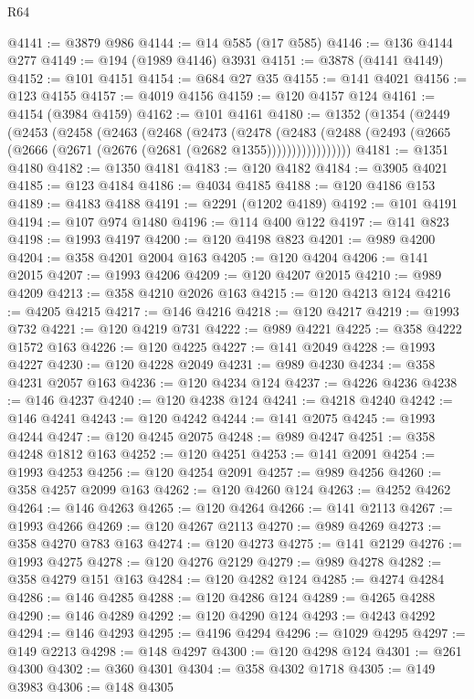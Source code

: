 \begin{lexlean}{R64}
\begin{coremodule}
@4141 := @3879 @986
@4144 := @14 @585 (@17 @585)
@4146 := @136 @4144 @277
@4149 := @194 (@1989 @4146) @3931
@4151 := @3878 (@4141 @4149)
@4152 := @101 @4151
@4154 := @684 @27 @35
@4155 := @141 @4021
@4156 := @123 @4155
@4157 := @4019 @4156
@4159 := @120 @4157 @124
@4161 := @4154 (@3984 @4159)
@4162 := @101 @4161
@4180 := @1352
    (@1354
      (@2449
        (@2453
          (@2458
            (@2463
              (@2468
                (@2473
                  (@2478
                    (@2483
                      (@2488 (@2493 (@2665 (@2666 (@2671 (@2676 (@2681 (@2682 @1355)))))))))))))))))
@4181 := @1351 @4180
@4182 := @1350 @4181
@4183 := @120 @4182
@4184 := @3905 @4021
@4185 := @123 @4184
@4186 := @4034 @4185
@4188 := @120 @4186 @153
@4189 := @4183 @4188
@4191 := @2291 (@1202 @4189)
@4192 := @101 @4191
@4194 := @107 @974 @1480
@4196 := @114 @400 @122
@4197 := @141 @823
@4198 := @1993 @4197
@4200 := @120 @4198 @823
@4201 := @989 @4200
@4204 := @358 @4201 @2004 @163
@4205 := @120 @4204
@4206 := @141 @2015
@4207 := @1993 @4206
@4209 := @120 @4207 @2015
@4210 := @989 @4209
@4213 := @358 @4210 @2026 @163
@4215 := @120 @4213 @124
@4216 := @4205 @4215
@4217 := @146 @4216
@4218 := @120 @4217
@4219 := @1993 @732
@4221 := @120 @4219 @731
@4222 := @989 @4221
@4225 := @358 @4222 @1572 @163
@4226 := @120 @4225
@4227 := @141 @2049
@4228 := @1993 @4227
@4230 := @120 @4228 @2049
@4231 := @989 @4230
@4234 := @358 @4231 @2057 @163
@4236 := @120 @4234 @124
@4237 := @4226 @4236
@4238 := @146 @4237
@4240 := @120 @4238 @124
@4241 := @4218 @4240
@4242 := @146 @4241
@4243 := @120 @4242
@4244 := @141 @2075
@4245 := @1993 @4244
@4247 := @120 @4245 @2075
@4248 := @989 @4247
@4251 := @358 @4248 @1812 @163
@4252 := @120 @4251
@4253 := @141 @2091
@4254 := @1993 @4253
@4256 := @120 @4254 @2091
@4257 := @989 @4256
@4260 := @358 @4257 @2099 @163
@4262 := @120 @4260 @124
@4263 := @4252 @4262
@4264 := @146 @4263
@4265 := @120 @4264
@4266 := @141 @2113
@4267 := @1993 @4266
@4269 := @120 @4267 @2113
@4270 := @989 @4269
@4273 := @358 @4270 @783 @163
@4274 := @120 @4273
@4275 := @141 @2129
@4276 := @1993 @4275
@4278 := @120 @4276 @2129
@4279 := @989 @4278
@4282 := @358 @4279 @151 @163
@4284 := @120 @4282 @124
@4285 := @4274 @4284
@4286 := @146 @4285
@4288 := @120 @4286 @124
@4289 := @4265 @4288
@4290 := @146 @4289
@4292 := @120 @4290 @124
@4293 := @4243 @4292
@4294 := @146 @4293
@4295 := @4196 @4294
@4296 := @1029 @4295
@4297 := @149 @2213
@4298 := @148 @4297
@4300 := @120 @4298 @124
@4301 := @261 @4300
@4302 := @360 @4301
@4304 := @358 @4302 @1718
@4305 := @149 @3983
@4306 := @148 @4305

\end{coremodule}
\end{lexlean}
